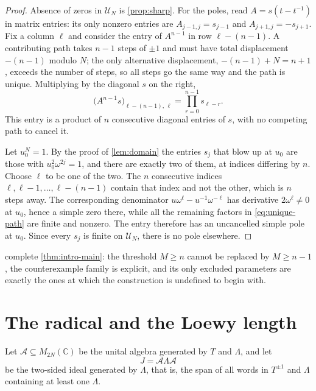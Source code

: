 \documentclass[11pt,reqno]{amsart}
\theoremstyle{plain}
\theoremstyle{definition}
\theoremstyle{remark}
\numberwithin{equation}{section}
\begin{document}
\begin{proof}
Absence of zeros in $\mathcal{U}_{N}$ is \cref{prop:sharp}. For the poles, read
$A=s(t-t^{-1})$ in matrix entries: its only nonzero entries are
$A_{j-1,j}=s_{j-1}$ and $A_{j+1,j}=-s_{j+1}$. Fix a column $\ell$ and consider
the entry of $A^{n-1}$ in row $\ell-(n-1)$. A contributing path takes $n-1$
steps of $\pm1$ and must have total displacement $-(n-1)$ modulo $N$; the only
alternative displacement, $-(n-1)+N=n+1$, exceeds the number of steps, so all
steps go the same way and the path is unique. Multiplying by the diagonal $s$
on the right,
\begin{equation}
  \bigl(A^{n-1}s\bigr)_{\ell-(n-1),\,\ell}=\prod_{r=0}^{n-1}s_{\ell-r}.
  \label{eq:unique-path}
\end{equation}
This entry is a product of $n$ consecutive diagonal entries of $s$, with no
competing path to cancel it.

Let $u_{0}^{N}=1$. By the proof of \cref{lem:domain} the entries $s_{j}$ that
blow up at $u_{0}$ are those with $u_{0}^{2}\omega^{2j}=1$, and there are
exactly two of them, at indices differing by $n$. Choose $\ell$ to be one of
the two. The $n$ consecutive indices $\ell,\ell-1,\dots,\ell-(n-1)$ contain
that index and not the other, which is $n$ steps away. The corresponding
denominator $u\omega^{\ell}-u^{-1}\omega^{-\ell}$ has derivative
$2\omega^{\ell}\ne0$ at $u_{0}$, hence a simple zero there, while all the
remaining factors in \cref{eq:unique-path} are finite and nonzero. The entry
therefore has an uncancelled simple pole at $u_{0}$. Since every $s_{j}$ is
finite on $\mathcal{U}_{N}$, there is no pole elsewhere.
\end{proof}

 complete \cref{thm:intro-main}: the threshold
$M\ge n$ cannot be replaced by $M\ge n-1$, the counterexample family is
explicit, and its only excluded parameters are exactly the ones at which the
construction is undefined to begin with.

\section{The radical and the Loewy length}
\label{sec:radical}

Let $\mathcal{A}\subseteq M_{2N}(\mathbb{C})$ be the unital algebra generated
by $T$ and $\Lambda$, and let
\begin{equation*}
  J=\mathcal{A}\Lambda\mathcal{A}
\end{equation*}
be the two-sided ideal generated by $\Lambda$, that is, the span of all words
in $T^{\pm1}$ and $\Lambda$ containing at least one $\Lambda$.
\end{document}
